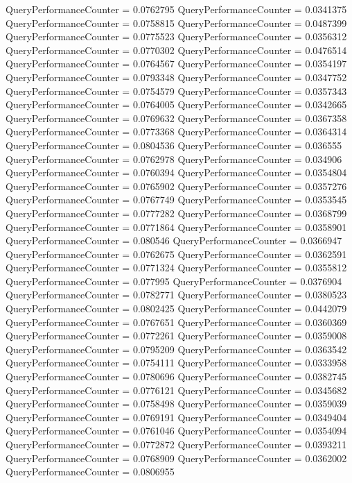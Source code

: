 \documentclass[9pt]{article}
\theoremstyle{plain}
\theoremstyle{definition}
\theoremstyle{remark}
\numberwithin{equation}{section}
\begin{document}
QueryPerformanceCounter  =  0.0762795
QueryPerformanceCounter  =  0.0341375
QueryPerformanceCounter  =  0.0758815
QueryPerformanceCounter  =  0.0487399
QueryPerformanceCounter  =  0.0775523
QueryPerformanceCounter  =  0.0356312
QueryPerformanceCounter  =  0.0770302
QueryPerformanceCounter  =  0.0476514
QueryPerformanceCounter  =  0.0764567
QueryPerformanceCounter  =  0.0354197
QueryPerformanceCounter  =  0.0793348
QueryPerformanceCounter  =  0.0347752
QueryPerformanceCounter  =  0.0754579
QueryPerformanceCounter  =  0.0357343
QueryPerformanceCounter  =  0.0764005
QueryPerformanceCounter  =  0.0342665
QueryPerformanceCounter  =  0.0769632
QueryPerformanceCounter  =  0.0367358
QueryPerformanceCounter  =  0.0773368
QueryPerformanceCounter  =  0.0364314
QueryPerformanceCounter  =  0.0804536
QueryPerformanceCounter  =  0.036555
QueryPerformanceCounter  =  0.0762978
QueryPerformanceCounter  =  0.034906
QueryPerformanceCounter  =  0.0760394
QueryPerformanceCounter  =  0.0354804
QueryPerformanceCounter  =  0.0765902
QueryPerformanceCounter  =  0.0357276
QueryPerformanceCounter  =  0.0767749
QueryPerformanceCounter  =  0.0353545
QueryPerformanceCounter  =  0.0777282
QueryPerformanceCounter  =  0.0368799
QueryPerformanceCounter  =  0.0771864
QueryPerformanceCounter  =  0.0358901
QueryPerformanceCounter  =  0.080546
QueryPerformanceCounter  =  0.0366947
QueryPerformanceCounter  =  0.0762675
QueryPerformanceCounter  =  0.0362591
QueryPerformanceCounter  =  0.0771324
QueryPerformanceCounter  =  0.0355812
QueryPerformanceCounter  =  0.077995
QueryPerformanceCounter  =  0.0376904
QueryPerformanceCounter  =  0.0782771
QueryPerformanceCounter  =  0.0380523
QueryPerformanceCounter  =  0.0802425
QueryPerformanceCounter  =  0.0442079
QueryPerformanceCounter  =  0.0767651
QueryPerformanceCounter  =  0.0360369
QueryPerformanceCounter  =  0.0772261
QueryPerformanceCounter  =  0.0359008
QueryPerformanceCounter  =  0.0795209
QueryPerformanceCounter  =  0.0363542
QueryPerformanceCounter  =  0.0754111
QueryPerformanceCounter  =  0.0333958
QueryPerformanceCounter  =  0.0780696
QueryPerformanceCounter  =  0.0382745
QueryPerformanceCounter  =  0.0776121
QueryPerformanceCounter  =  0.0345682
QueryPerformanceCounter  =  0.0758498
QueryPerformanceCounter  =  0.0359039
QueryPerformanceCounter  =  0.0769191
QueryPerformanceCounter  =  0.0349404
QueryPerformanceCounter  =  0.0761046
QueryPerformanceCounter  =  0.0354094
QueryPerformanceCounter  =  0.0772872
QueryPerformanceCounter  =  0.0393211
QueryPerformanceCounter  =  0.0768909
QueryPerformanceCounter  =  0.0362002
QueryPerformanceCounter  =  0.0806955
\end{document}
